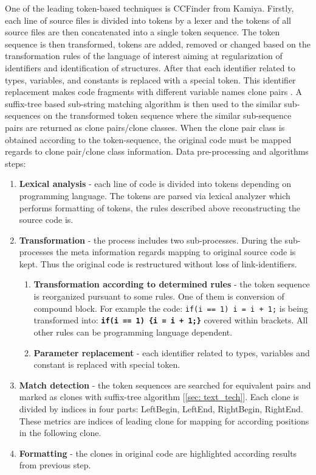 \documentclass{report}
\begin{document}
One of the leading token-based techniques is CCFinder from Kamiya\cite{tocken_kamiya}. Firstly, each line of source files is divided into tokens by a lexer and the tokens of all source files are then concatenated into a single token sequence. The token sequence is then transformed, tokens are added, removed or changed based on the transformation rules of the language of interest aiming at regularization of identifiers and identification of structures. 
After that each identifier related to types, variables, and constants is replaced with a special token\cite{tocken_kamiya}. This identifier replacement makes code fragments with different variable names clone pairs \cite{tocken_kamiya}. A suffix-tree based sub-string matching algorithm is then used 
to the similar sub-sequences on the transformed token sequence where the similar sub-sequence pairs are returned as clone pairs/clone classes\cite{tocken_kamiya}. When the clone pair class is obtained according to the token-sequence, the original code must be mapped regards to clone pair/clone class information. Data pre-processing and algorithms steps:
\begin{enumerate}
  \item \textbf{Lexical analysis} - each line of code is divided into tokens depending on programming language. The tokens are parsed via lexical analyzer which performs formatting of tokens, the rules described above reconstructing the source code is.
\item \textbf{Transformation}  - the process includes two sub-processes. During the sub-processes the meta information regards mapping to original source code is kept. Thus the original code is restructured without loss of link-identifiers.
  \begin{enumerate}[label*=\arabic*.]
    \item \textbf{Transformation according to determined rules} - the token sequence is reorganized pursuant to some rules. One of them is conversion of compound block. For example the code: \texttt{if(i == 1) i = i + 1;} is being transformed into: \texttt{\textbf{if(i == 1) \{i = i + 1;\}}} covered within brackets. All other rules can be programming language dependent.
    \item \textbf{Parameter replacement} - each identifier related to types, variables and constant is replaced with special token\cite{tocken_kamiya}.
  \end{enumerate} 
  \item\textbf{Match detection} - the token sequences are searched for equivalent pairs and marked as clones with suffix-tree algorithm [\ref{sec: text_tech}]. Each clone is divided by indices in four parts: LeftBegin, LeftEnd, RightBegin, RightEnd. These metrics are indices of leading clone for mapping for according positions in the following clone.
  \item\textbf{Formatting} - the clones in original code are highlighted according results from previous step.
\end{enumerate}
\end{document}
